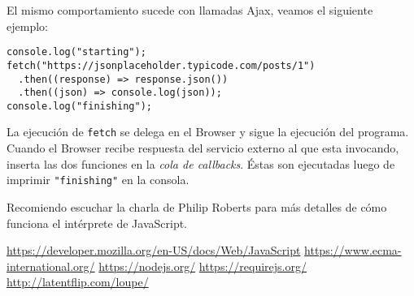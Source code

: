 \documentclass[a4paper, oneside, titlepage, 12pt]{paper}
\begin{document}
El mismo comportamiento sucede con llamadas Ajax, veamos el siguiente ejemplo:

\begin{verbatim}
console.log("starting");
fetch("https://jsonplaceholder.typicode.com/posts/1")
  .then((response) => response.json())
  .then((json) => console.log(json));
console.log("finishing");
\end{verbatim}

La ejecución de \texttt{fetch} se delega en el Browser y sigue la ejecución del programa. Cuando el Browser recibe respuesta del servicio externo al que esta invocando, inserta las dos funciones en la \textit{cola de callbacks}. Éstas son ejecutadas luego de imprimir \texttt{"finishing"} en la consola.
\newline

Recomiendo escuchar la charla de Philip Roberts\cite{loupe} para más detalles de cómo funciona el intérprete de JavaScript.


\begin{thebibliography}{100} %
 \url{https://developer.mozilla.org/en-US/docs/Web/JavaScript}
 \url{https://www.ecma-international.org/}
 \url{https://nodejs.org/}
 \url{https://requirejs.org/}
 \url{http://latentflip.com/loupe/}
\end{thebibliography}
\end{document}
